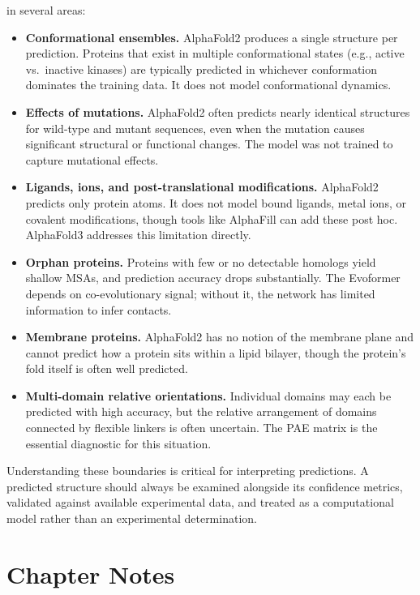  in several areas:
\begin{itemize}
\item \textbf{Conformational ensembles.} AlphaFold2 produces a single structure per prediction.
Proteins that exist in multiple conformational states (e.g., active vs.\ inactive kinases) are typically predicted in whichever conformation dominates the training data.
It does not model conformational dynamics.
\item \textbf{Effects of mutations.} AlphaFold2 often predicts nearly identical structures for wild-type and mutant sequences, even when the mutation causes significant structural or functional changes.
The model was not trained to capture mutational effects.
\item \textbf{Ligands, ions, and post-translational modifications.} AlphaFold2 predicts only protein atoms.
It does not model bound ligands, metal ions, or covalent modifications, though tools like AlphaFill can add these post hoc.
AlphaFold3 addresses this limitation directly.
\item \textbf{Orphan proteins.} Proteins with few or no detectable homologs yield shallow MSAs, and prediction accuracy drops substantially.
The Evoformer depends on co-evolutionary signal; without it, the network has limited information to infer contacts.
\item \textbf{Membrane proteins.} AlphaFold2 has no notion of the membrane plane and cannot predict how a protein sits within a lipid bilayer, though the protein's fold itself is often well predicted.
\item \textbf{Multi-domain relative orientations.} Individual domains may each be predicted with high accuracy, but the relative arrangement of domains connected by flexible linkers is often uncertain.
The PAE matrix is the essential diagnostic for this situation.
\end{itemize}

Understanding these boundaries is critical for interpreting predictions.
A predicted structure should always be examined alongside its confidence metrics, validated against available experimental data, and treated as a computational model rather than an experimental determination.


\section{Chapter Notes}
\label{sec:af2-notes}

